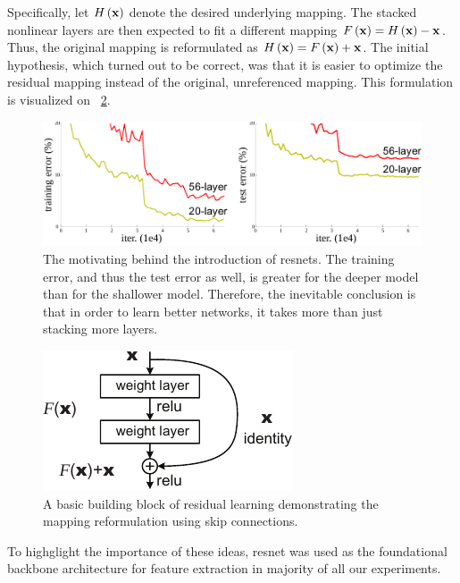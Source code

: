 Specifically, let ${H} \left( \mathbf{x} \right)$ denote the desired underlying mapping. The stacked nonlinear layers are then expected to fit a different mapping ${F} \left( \mathbf{x} \right) = {H} \left( \mathbf{x} \right) - \mathbf{x}$. Thus, the original mapping is reformulated as ${H} \left( \mathbf{x} \right) = {F} \left( \mathbf{x} \right) + \mathbf{x}$. The initial hypothesis, which turned out to be correct, was that it is easier to optimize the residual mapping instead of the original, unreferenced mapping. This formulation is visualized on \figstr{}~\ref{fig:SkipConnections}.

\begin{figure}[t]
    \centerline{\includegraphics[width=0.9\linewidth]{figures/theoretical_foundations/resnet_motivation.pdf}}
    \caption[\Gls{resnet} motivation]{The motivating behind the introduction of \glspl{resnet}. The training error, and thus the test error as well, is greater for the deeper model than for the shallower model. Therefore, the inevitable conclusion is that in order to learn better networks, it takes more than just stacking more layers. }
    \label{fig:ResnetMotivation}
\end{figure}

\begin{figure}[t]
    \centerline{\includegraphics[width=0.35\linewidth]{figures/theoretical_foundations/skip_connections.pdf}}
    \caption[Skip connections]{A basic building block of residual learning demonstrating the mapping reformulation using skip connections. }
    \label{fig:SkipConnections}
\end{figure}

To highglight the importance of these ideas, \Gls{resnet} was used as the foundational backbone architecture for feature extraction in majority of all our experiments.

